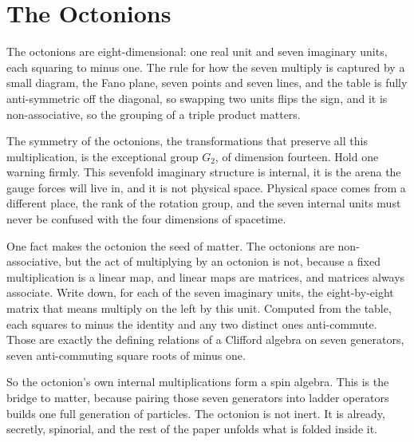 \section{The Octonions}

The octonions are eight-dimensional: one real unit and seven imaginary units, each squaring to minus one. The rule for how the seven multiply is captured by a small diagram, the Fano plane, seven points and seven lines, and the table is fully anti-symmetric off the diagonal, so swapping two units flips the sign, and it is non-associative, so the grouping of a triple product matters.

The symmetry of the octonions, the transformations that preserve all this multiplication, is the exceptional group $G_2$, of dimension fourteen. Hold one warning firmly. This sevenfold imaginary structure is internal, it is the arena the gauge forces will live in, and it is not physical space. Physical space comes from a different place, the rank of the rotation group, and the seven internal units must never be confused with the four dimensions of spacetime.

One fact makes the octonion the seed of matter. The octonions are non-associative, but the act of multiplying by an octonion is not, because a fixed multiplication is a linear map, and linear maps are matrices, and matrices always associate. Write down, for each of the seven imaginary units, the eight-by-eight matrix that means multiply on the left by this unit. Computed from the table, each squares to minus the identity and any two distinct ones anti-commute. Those are exactly the defining relations of a Clifford algebra on seven generators, seven anti-commuting square roots of minus one.

So the octonion's own internal multiplications form a spin algebra. This is the bridge to matter, because pairing those seven generators into ladder operators builds one full generation of particles. The octonion is not inert. It is already, secretly, spinorial, and the rest of the paper unfolds what is folded inside it.
